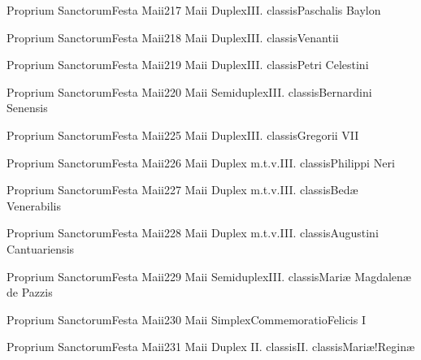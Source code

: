 \documentclass[liber-responsorialis_sanctorale.tex]{subfiles}
\begin{document}
	{Proprium Sanctorum}{Festa Maii}{2}{17 Maii}
	{Duplex}{III. classis}{Paschalis Baylon}
	{\conprubric}
	{\respdetemp}

	{Proprium Sanctorum}{Festa Maii}{2}{18 Maii}
	{Duplex}{III. classis}{Venantii}
	{\mrtprubric}
	{\respdetemp}

	{Proprium Sanctorum}{Festa Maii}{2}{19 Maii}
	{Duplex}{III. classis}{Petri Celestini}
	{\coporubric}
	{\respdetemp}

	{Proprium Sanctorum}{Festa Maii}{2}{20 Maii}
	{Semiduplex}{III. classis}{Bernardini Senensis}
	{\conprubric}
	{\respdetemp}

	{Proprium Sanctorum}{Festa Maii}{2}{25 Maii}
	{Duplex}{III. classis}{Gregorii VII}
	{\coporubric}
	{\respdetemp}

	{Proprium Sanctorum}{Festa Maii}{2}{26 Maii}
	{Duplex m.t.v.}{III. classis}{Philippi Neri}
	{\conprubric}
	{\respdetemp}

	{Proprium Sanctorum}{Festa Maii}{2}{27 Maii}
	{Duplex m.t.v.}{III. classis}{Bedæ Venerabilis}
	{\conpdorubric}
	{\respdetemp}

	{Proprium Sanctorum}{Festa Maii}{2}{28 Maii}
	{Duplex m.t.v.}{III. classis}{Augustini Cantuariensis}
	{\coporubric}
	{\respdetemp}

	{Proprium Sanctorum}{Festa Maii}{2}{29 Maii}
	{Semiduplex}{III. classis}{Mariæ Magdalenæ de Pazzis}
	{\vnrubric}
	{\respdetemp}

	{Proprium Sanctorum}{Festa Maii}{2}{30 Maii}
	{Simplex}{Commemoratio}{Felicis I}
	{}
	{}
\rubric{\respdetemp}

	{Proprium Sanctorum}{Festa Maii}{2}{31 Maii}
	{Duplex II. classis}{II. classis}{Mariæ!Reginæ}
	{}
	{}
\end{document}

